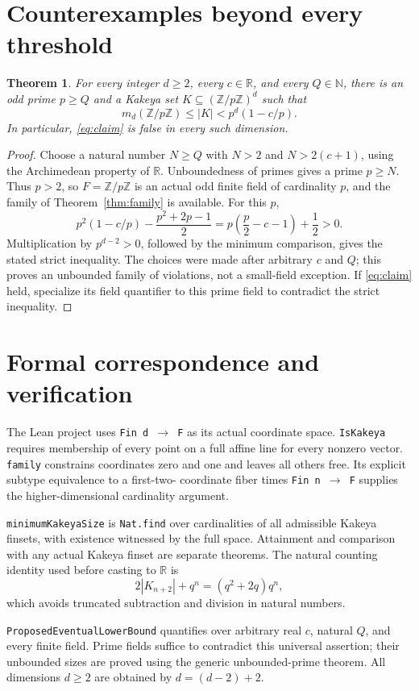 \documentclass[11pt]{article}
\newcommand{\R}{\mathbb R}
\newcommand{\N}{\mathbb N}
\newtheorem{theorem}{Theorem}
\begin{document}
\section{Counterexamples beyond every threshold}
\begin{theorem}\label{thm:unbounded}
For every integer $d\geq2$, every $c\in\R$, and every $Q\in\N$, there is an
odd prime $p\geq Q$ and a Kakeya set $K\subseteq(\mathbb Z/p\mathbb Z)^d$ such that
\[
 m_d(\mathbb Z/p\mathbb Z)\leq |K|<p^d(1-c/p).
\]
In particular, \eqref{eq:claim} is false in every such dimension.
\end{theorem}
\begin{proof}
Choose a natural number $N\geq Q$ with $N>2$ and $N>2(c+1)$, using the
Archimedean property of $\R$. Unboundedness of primes gives a prime $p\geq N$.
Thus $p>2$, so $F=\mathbb Z/p\mathbb Z$ is an actual odd finite field of
cardinality $p$, and the family of Theorem~\ref{thm:family} is available.
For this $p$,
\[
 p^2(1-c/p)-\frac{p^2+2p-1}{2}
   =p\left(\frac p2-c-1\right)+\frac12>0.
\]
Multiplication by $p^{d-2}>0$, followed by the minimum comparison, gives the
stated strict inequality. The choices were made after arbitrary $c$ and $Q$;
this proves an unbounded family of violations, not a small-field exception.
If \eqref{eq:claim} held, specialize its field quantifier to this prime field
to contradict the strict inequality.
\end{proof}

\section{Formal correspondence and verification}
The Lean project uses \texttt{Fin d $\to$ F} as its actual coordinate space.
\texttt{IsKakeya} requires membership of every point on a full affine line
for every nonzero vector. \texttt{family} constrains coordinates zero and one
and leaves all others free. Its explicit subtype equivalence to a first-two-
coordinate fiber times \texttt{Fin n $\to$ F} supplies the higher-dimensional
cardinality argument.

\texttt{minimumKakeyaSize} is \texttt{Nat.find} over cardinalities of all
admissible Kakeya finsets, with existence witnessed by the full space.
Attainment and comparison with any actual Kakeya finset are separate theorems.
The natural counting identity used before casting to $\R$ is
\[
 2|K_{n+2}|+q^n=(q^2+2q)q^n,
\]
which avoids truncated subtraction and division in natural numbers.

\texttt{ProposedEventualLowerBound} quantifies over arbitrary real $c$,
natural $Q$, and every finite field. Prime fields suffice to contradict this
universal assertion; their unbounded sizes are proved using the generic
unbounded-prime theorem. All dimensions $d\geq2$ are obtained by $d=(d-2)+2$.
\end{document}

